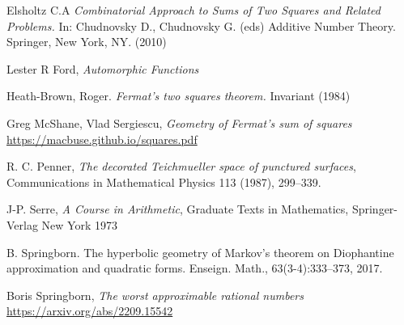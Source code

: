 \documentclass[12pt]{amsart}
\theoremstyle{plain}
\theoremstyle{definition}
\begin{document}

Elsholtz C.A 
\textit{Combinatorial Approach to Sums of Two Squares and Related Problems.}
 In: Chudnovsky D., Chudnovsky G. (eds) Additive Number Theory. Springer, New York, NY.
 (2010) 


Lester R Ford,
\textit{Automorphic Functions}


%



Heath-Brown, Roger. 
\textit{ Fermat’s two squares theorem.} Invariant (1984) 




Greg McShane, Vlad Sergiescu,
\textit{Geometry of Fermat's sum of squares}
\url{https://macbuse.github.io/squares.pdf}

R. C. Penner, 
\textit{The decorated Teichmueller space of punctured surfaces}, 
Communications in Mathematical Physics 113 (1987), 299–339.



J-P. Serre,
\textit{A Course in Arithmetic},
Graduate Texts in Mathematics,
Springer-Verlag New York
1973



B. Springborn. The hyperbolic geometry of Markov’s theorem on Diophantine
approximation and quadratic forms. Enseign. Math., 63(3-4):333–373, 2017.

Boris Springborn,
\textit{The worst approximable rational numbers}
\url{https://arxiv.org/abs/2209.15542}
\end{document}
